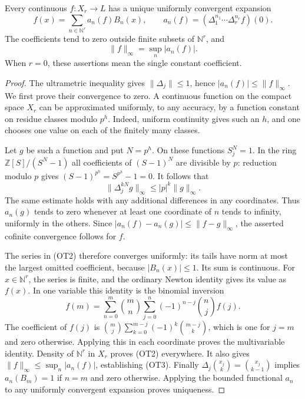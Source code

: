 \begin{theorem}\label{ot-mahler}
Every continuous $f:X_r\to L$ has a unique uniformly convergent
expansion
\[
 f(x)=\sum_{n\in\mathbb N^r}a_n(f)B_n(x),\qquad
 a_n(f)=(\Delta_1^{n_1}\cdots\Delta_r^{n_r}f)(0).
 \tag{OT2}
\]
The coefficients tend to zero outside finite subsets of
$\mathbb N^r$, and
\[
                  \|f\|_\infty=\sup_n|a_n(f)|.
 \tag{OT3}
\]
When $r=0$, these assertions mean the single constant coefficient.
\end{theorem}
\begin{proof}
The ultrametric inequality gives $\|\Delta_j\|\le1$, hence
$|a_n(f)|\le\|f\|_\infty$.  We first prove their convergence
to zero.  A continuous function on the compact space $X_r$ can be
approximated uniformly, to any accuracy, by a function constant on
residue classes modulo $p^h$.  Indeed, uniform continuity gives
such an $h$, and one chooses one value on each of the finitely many
classes.

Let $g$ be such a function and put $N=p^h$.  On these functions
$S_j^N=1$.  In the ring $\mathbb Z[S]/(S^N-1)$ all coefficients
of $(S-1)^N$ are divisible by $p$: reduction modulo $p$ gives
$(S-1)^{p^h}=S^{p^h}-1=0$.  It follows that
\[
 \|\Delta_j^{kN}g\|_\infty\le |p|^k\|g\|_\infty.
 \tag{OT4}
\]
The same estimate holds with any additional differences in any
coordinates.  Thus $a_n(g)$ tends to zero whenever at least one
coordinate of $n$ tends to infinity, uniformly in the others.
Since $|a_n(f)-a_n(g)|\le\|f-g\|_\infty$, the asserted
cofinite convergence follows for $f$.

The series in (OT2) therefore converges uniformly: its tails have
norm at most the largest omitted coefficient, because
$|B_n(x)|\le1$.  Its sum is continuous.  For
$x\in\mathbb N^r$, the series is finite, and the ordinary Newton
identity gives its value as $f(x)$.  In one variable this identity
is the binomial inversion
\[
 f(m)=\sum_{n=0}^m\binom mn
          \sum_{j=0}^n(-1)^{n-j}\binom nj f(j).
\]
The coefficient of $f(j)$ is
$\binom mj\sum_{k=0}^{m-j}(-1)^k\binom{m-j}{k}$, which is
one for $j=m$ and zero otherwise.  Applying this in each coordinate
proves the multivariable identity.  Density of $\mathbb N^r$ in
$X_r$ proves (OT2) everywhere.  It also gives
$\|f\|_\infty\le\sup_n|a_n(f)|$, establishing (OT3).
Finally $\Delta_j\binom{x_j}{k}=\binom{x_j}{k-1}$ implies
$a_n(B_m)=1$ if $n=m$ and zero otherwise.  Applying the bounded
functional $a_n$ to any uniformly convergent expansion proves
uniqueness.
\end{proof}

